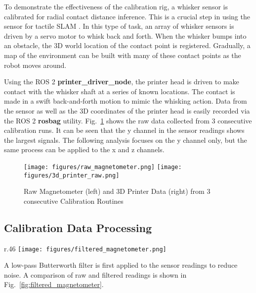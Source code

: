 \documentclass[runningheads]{llncs}
\begin{document}
To demonstrate the effectiveness of the calibration rig, a whisker sensor is calibrated for radial contact distance inference. This is a crucial step in using the sensor for tactile SLAM \cite{pearsonSimultaneousLocalisationMapping2013, leporaNaiveBayesNovelty2010}. In this type of task, an array of whisker sensors is driven by a servo motor to whisk back and forth. When the whisker bumps into an obstacle, the 3D world location of the contact point is registered. Gradually, a map of the environment can be built with many of these contact points as the robot moves around.

Using the ROS 2 \textbf{printer\_driver\_node}, the printer head is driven to make contact with the whisker shaft at a series of known locations. The contact is made in a swift back-and-forth motion to mimic the whisking action. Data from the sensor as well as the 3D coordinates of the printer head is easily recorded via the ROS 2 \textbf{rosbag} utility. Fig.~\ref{fig:calibration_routine} shows the raw data collected from 3 consecutive calibration runs. It can be seen that the y channel in the sensor readings shows the largest signals. The following analysis focuses on the y channel only, but the same process can be applied to the x and z channels.

\begin{figure}
    \centering
    \texttt{[image: figures/raw\_magnetometer.png]}
    \texttt{[image: figures/3d\_printer\_raw.png]}
    \caption{Raw Magnetometer (left) and 3D Printer Data (right) from 3 consecutive Calibration Routines}
    \label{fig:calibration_routine}
    \vspace{-10pt}
\end{figure}


\subsection{Calibration Data Processing}\label{sec:calibration_data_analysis}

\begin{wrapfigure}{r}{.46\textwidth}
    \centering
    \texttt{[image: figures/filtered\_magnetometer.png]}
    \caption{Raw and Filtered Magnetometer Reading in the Y-Axis }
    \label{fig:filtered_magnetometer}
\end{wrapfigure}

A low-pass Butterworth filter is first applied to the sensor readings to reduce noise. A comparison of raw and filtered readings is shown in Fig.~\ref{fig:filtered_magnetometer}.
\end{document}
